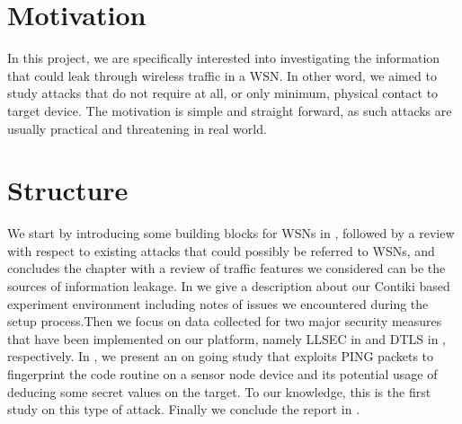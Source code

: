 \section{Motivation}
In this project, we are specifically interested into investigating the information that could leak through wireless traffic in a WSN. In other word, we aimed to study attacks that do not require at all, or only minimum, physical contact to target device. The motivation is simple and straight forward, as such attacks are usually practical and threatening in real world.

\section{Structure}
We start by introducing some building blocks for WSNs in , followed by a review with respect to existing attacks that could possibly be referred to WSNs, and concludes the chapter with a review of traffic features we considered can be the sources of information leakage. In  we give a description about our Contiki\cite{Contiki} based experiment environment including notes of issues we encountered during the setup process.Then we focus on data collected for two major security measures that have been implemented on our platform, namely LLSEC in  and DTLS in , respectively. In , we present an on going study that exploits PING packets to fingerprint the code routine on a sensor node device and its potential usage of deducing some secret values on the target. To our knowledge, this is the first study on this type of attack. Finally we conclude the report in .